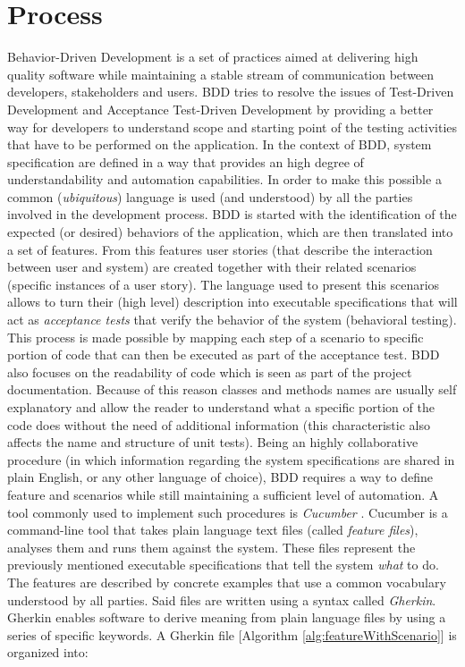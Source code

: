 \section{Process} 

Behavior-Driven Development \cite{BDD} is a set of practices aimed at delivering high quality software while maintaining a stable stream of communication between developers, stakeholders and users. BDD tries to resolve the issues of Test-Driven Development and Acceptance Test-Driven Development by providing a better way for developers to understand scope and starting point of the testing activities that have to be performed on the application.
In the context of BDD, system specification are defined in a way that provides an high degree of understandability and automation capabilities. In order to make this possible a common (\textit{ubiquitous}) language is used (and understood) by all the parties involved in the development process.
BDD is started with the identification of the expected (or desired) behaviors of the application, which are then translated into a set of features. From this features user stories (that describe the interaction between user and system) are created together with their related scenarios (specific instances of a user story). The language used to present this scenarios allows to turn their (high level) description into executable specifications that will act as \textit{acceptance tests} that verify the behavior of the system (behavioral testing). This process is made possible by mapping each step of a scenario to specific portion of code that can then be executed as part of the acceptance test.
BDD also focuses on the readability of code which is seen as part of the project documentation. Because of this reason classes and methods names are usually self explanatory and allow the reader to understand what a specific portion of the code does without the need of additional information (this characteristic also affects the name and structure of unit tests).
Being an highly collaborative procedure (in which information regarding the system specifications are shared in plain English, or any other language of choice), BDD requires a way to define feature and scenarios while still maintaining a sufficient level of automation. A tool commonly used to implement such procedures is \textit{Cucumber} \cite{Cucumber}. Cucumber is a command-line tool that takes plain language text files (called \textit{feature files}), analyses them and runs them against the system. These files represent the previously mentioned executable specifications that tell the system \textit{what} to do. The features are described by concrete examples that use a common vocabulary understood by all parties. Said files are written using a syntax called \textit{Gherkin}. Gherkin enables software to derive meaning from plain language files by using a series of specific keywords. A Gherkin file [Algorithm \ref{alg:featureWithScenario}] is organized into:

